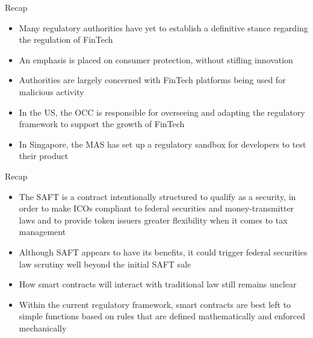 \documentclass[11pt]{beamer}
\begin{document}


\begin{frame}{Recap}
	\begin{itemize}
		\item Many regulatory authorities have yet to establish a definitive stance regarding the regulation of FinTech
		\item An emphasis is placed on consumer protection, without stifling innovation
		\item Authorities are largely concerned with FinTech platforms being used for malicious activity
		\item In the US, the OCC is responsible for overseeing and adapting the regulatory framework to support the growth of FinTech
		\item In Singapore, the MAS has set up a regulatory sandbox for developers to test their product
	\end{itemize}
\end{frame}


\begin{frame}{Recap}
	\begin{itemize}
		\item The SAFT is a contract intentionally structured to qualify as a security, in order to make ICOs compliant to federal securities and money-transmitter laws and to provide token issuers greater flexibility when it comes to tax management
		\item Although SAFT appears to have its benefits, it could trigger federal securities law scrutiny well beyond the initial SAFT sale
		\item How smart contracts will interact with traditional law still remains unclear
		\item Within the current regulatory framework, smart contracts are best left to simple functions based on rules that are defined mathematically and enforced mechanically
	\end{itemize}
\end{frame}

\end{document}
